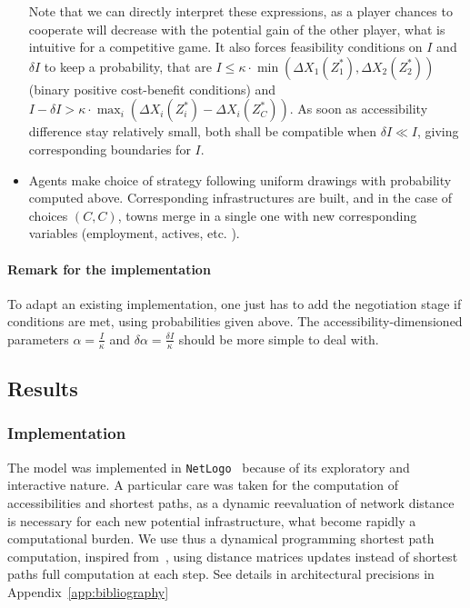 \begin{itemize}
Note that we can directly interpret these expressions, as a player chances to cooperate will decrease with the potential gain of the other player, what is intuitive for a competitive game. It also forces feasibility conditions on $I$ and $\delta I$ to keep a probability, that are $I \leq \kappa\cdot \min(\Delta X_1(Z^{\ast}_1),\Delta X_2(Z^{\ast}_2))$ (binary positive cost-benefit conditions) and $I-\delta I > \kappa \cdot \max_i (\Delta X_i(Z^{\ast}_i)-\Delta X_i(Z^{\ast}_C))$. As soon as accessibility difference stay relatively small, both shall be compatible when $\delta I \ll I$, giving corresponding boundaries for $I$.

\item Agents make choice of strategy following uniform drawings with probability computed above. Corresponding infrastructures are built, and in the case of choices $(C,C)$, towns merge in a single one with new corresponding variables (employment, actives, etc. ).


\end{itemize}



\paragraph{Remark for the implementation}

To adapt an existing implementation, one just has to add the negotiation stage if conditions are met, using probabilities given above. The accessibility-dimensioned parameters $\alpha = \frac{I}{\kappa}$ and $\delta \alpha = \frac{\delta I}{\kappa}$ should be more simple to deal with.




\subsection{Results}


\subsubsection{Implementation}

The model was implemented in \texttt{NetLogo}~\cite{wilensky1999netlogo} because of its exploratory and interactive nature. A particular care was taken for the computation of accessibilities and shortest paths, as a dynamic reevaluation of network distance is necessary for each new potential infrastructure, what become rapidly a computational burden. We use thus a dynamical programming shortest path computation, inspired from~\cite{tretyakov2011fast}, using distance matrices updates instead of shortest paths full computation at each step. See details in architectural precisions in Appendix~\ref{app:bibliography}


